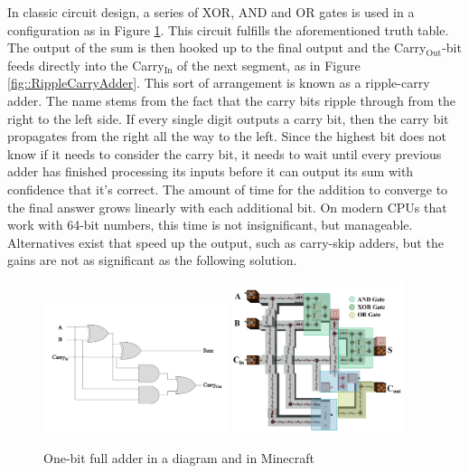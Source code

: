 In classic circuit design, a series of XOR, AND and OR gates is used in a configuration as in Figure \ref{fig::FullAdder}. This circuit fulfills the aforementioned truth table. The output of the sum is then hooked up to the final output and the Carry$_{\text{Out}}$-bit feeds directly into the Carry$_{\text{In}}$ of the next segment, as in Figure \ref{fig::RippleCarryAdder}. This sort of arrangement is known as a ripple-carry adder. The name stems from the fact that the carry bits ripple through from the right to the left side. If every single digit outputs a carry bit, then the carry bit propagates from the right all the way to the left. Since the highest bit does not know if it needs to consider the carry bit, it needs to wait until every previous adder has finished processing its inputs before it can output its sum with confidence that it's correct. The amount of time for the addition to converge to the final answer grows linearly with each additional bit. On modern CPUs that work with 64-bit numbers, this time is not insignificant, but manageable. Alternatives exist that speed up the output, such as carry-skip adders, but the gains are not as significant as the following solution.

\begin{figure}[!h]
    \begin{center}
        \includegraphics[width=0.48\textwidth]{Figures/FullAdder.png}
        \includegraphics[width=0.45\textwidth]{Figures/FullAdderMC-small.png}
        \caption{One-bit full adder in a diagram and in Minecraft}
        \label{fig::FullAdder}
    \end{center}
\end{figure}

